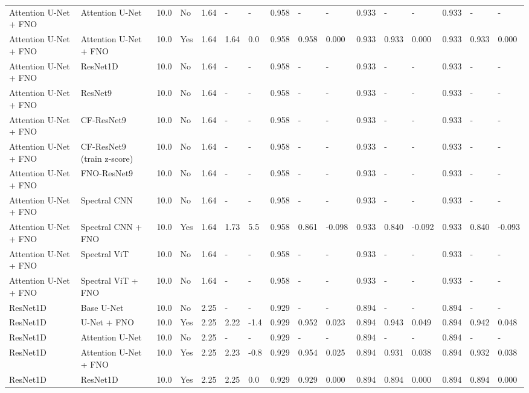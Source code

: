 \begin{longtable}{llllllllllllllll}
Attention U-Net + FNO & Attention U-Net & 10.0 & No & 1.64 & - & - & 0.958 & - & - & 0.933 & - & - & 0.933 & - & - \\
Attention U-Net + FNO & Attention U-Net + FNO & 10.0 & Yes & 1.64 & 1.64 & 0.0 & 0.958 & 0.958 & 0.000 & 0.933 & 0.933 & 0.000 & 0.933 & 0.933 & 0.000 \\
Attention U-Net + FNO & ResNet1D & 10.0 & No & 1.64 & - & - & 0.958 & - & - & 0.933 & - & - & 0.933 & - & - \\
Attention U-Net + FNO & ResNet9 & 10.0 & No & 1.64 & - & - & 0.958 & - & - & 0.933 & - & - & 0.933 & - & - \\
Attention U-Net + FNO & CF-ResNet9 & 10.0 & No & 1.64 & - & - & 0.958 & - & - & 0.933 & - & - & 0.933 & - & - \\
Attention U-Net + FNO & CF-ResNet9 (train z-score) & 10.0 & No & 1.64 & - & - & 0.958 & - & - & 0.933 & - & - & 0.933 & - & - \\
Attention U-Net + FNO & FNO-ResNet9 & 10.0 & No & 1.64 & - & - & 0.958 & - & - & 0.933 & - & - & 0.933 & - & - \\
Attention U-Net + FNO & Spectral CNN & 10.0 & No & 1.64 & - & - & 0.958 & - & - & 0.933 & - & - & 0.933 & - & - \\
Attention U-Net + FNO & Spectral CNN + FNO & 10.0 & Yes & 1.64 & 1.73 & 5.5 & 0.958 & 0.861 & -0.098 & 0.933 & 0.840 & -0.092 & 0.933 & 0.840 & -0.093 \\
Attention U-Net + FNO & Spectral ViT & 10.0 & No & 1.64 & - & - & 0.958 & - & - & 0.933 & - & - & 0.933 & - & - \\
Attention U-Net + FNO & Spectral ViT + FNO & 10.0 & No & 1.64 & - & - & 0.958 & - & - & 0.933 & - & - & 0.933 & - & - \\
ResNet1D & Base U-Net & 10.0 & No & 2.25 & - & - & 0.929 & - & - & 0.894 & - & - & 0.894 & - & - \\
ResNet1D & U-Net + FNO & 10.0 & Yes & 2.25 & 2.22 & -1.4 & 0.929 & 0.952 & 0.023 & 0.894 & 0.943 & 0.049 & 0.894 & 0.942 & 0.048 \\
ResNet1D & Attention U-Net & 10.0 & No & 2.25 & - & - & 0.929 & - & - & 0.894 & - & - & 0.894 & - & - \\
ResNet1D & Attention U-Net + FNO & 10.0 & Yes & 2.25 & 2.23 & -0.8 & 0.929 & 0.954 & 0.025 & 0.894 & 0.931 & 0.038 & 0.894 & 0.932 & 0.038 \\
ResNet1D & ResNet1D & 10.0 & Yes & 2.25 & 2.25 & 0.0 & 0.929 & 0.929 & 0.000 & 0.894 & 0.894 & 0.000 & 0.894 & 0.894 & 0.000 \\

\end{longtable}
